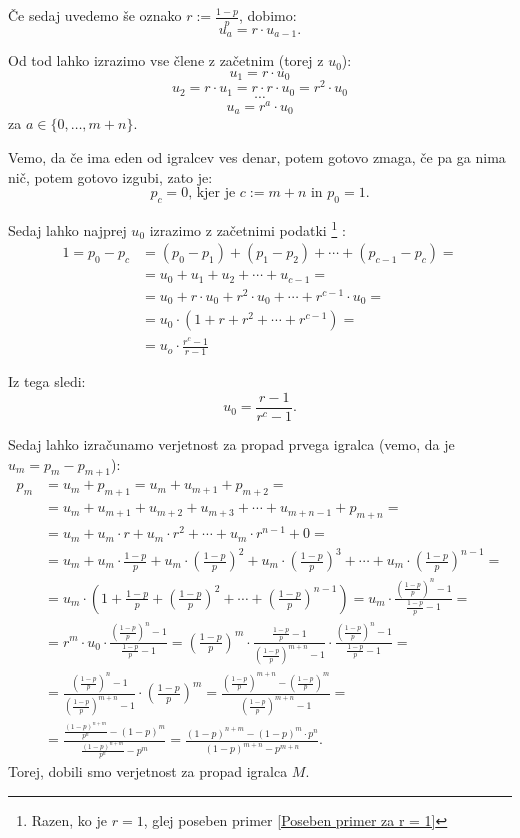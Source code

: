 \documentclass[12pt, a4paper]{article}
\begin{document}
Če sedaj uvedemo še oznako $r:=\frac{1-p}{p}$, dobimo:
$$u_a = r \cdot u_{a-1}.$$


Od tod lahko izrazimo vse člene z začetnim (torej z $u_0$):
$$u_1 = r \cdot u_0$$
$$u_2 = r \cdot u_1 = r \cdot r \cdot u_0 = r^2 \cdot u_0$$ 
$$\cdots $$
$$u_a = r^a \cdot u_0$$ za $ a \in \{ 0, \dotso , m + n\}.$

Vemo, da če ima eden od igralcev ves denar, potem gotovo zmaga, če pa ga nima nič, potem gotovo izgubi, zato je:
$$p_c = 0 \textrm{, kjer je } c := m + n \textrm{ in } p_0 = 1.$$

Sedaj lahko najprej $u_0$ izrazimo z začetnimi podatki \footnote{Razen, ko je $r = 1$, glej poseben primer \ref{Poseben primer za r = 1}} :
\begin{equation*}
\begin{split}
1 = p_0 - p_c &= (p_0 - p_1) + (p_1 - p_2) + \cdots + (p_{c-1} - p_c) = \\
        &= u_0 + u_1 + u_2 + \cdots + u_{c-1} = \\
        &= u_0 + r \cdot u_0 + r^2 \cdot u_0 + \cdots + r^{c-1} \cdot u_0 = \\
        &= u_0 \cdot (1 + r + r^2 + \cdots + r^{c-1}) = \\
        &= u_o \cdot \frac{r^c - 1}{r-1}  
\end{split}
\end{equation*}  

Iz tega sledi: $$u_0 = \frac{r-1}{r^c -1}.$$


Sedaj lahko izračunamo verjetnost za propad prvega igralca (vemo, da je $u_m = p_m - p_{m+1}$):
\begin{equation*}
\begin{split}
p_m &= u_m + p_{m+1} = u_m + u_{m+1} + p_{m+2} = \\
    &= u_m + u_{m+1} + u_{m+2} + u_{m+3} + \cdots + u_{m+n-1} + p_{m+n} = \\
    &= u_m + u_m \cdot r + u_m \cdot r^2 + \cdots + u_m \cdot r^{n-1} + 0 = \\
    &= u_m + u_m \cdot \frac{1-p}{p} + u_m \cdot (\frac{1-p}{p})^2 + u_m \cdot (\frac{1-p}{p})^3 + \cdots + u_m \cdot (\frac{1-p}{p})^{n-1} = \\
    &= u_m \cdot (1 + \frac{1-p}{p} + (\frac{1-p}{p})^2 + \cdots + (\frac{1-p}{p})^{n-1}) 
    = u_m \cdot \frac{(\frac{1-p}{p})^n - 1}{\frac{1-p}{p} - 1} = \\
    &= r^m \cdot u_0 \cdot \frac{(\frac{1-p}{p})^n - 1}{\frac{1-p}{p} - 1}  
    = (\frac{1-p}{p})^m \cdot \frac{\frac{1-p}{p} - 1}{(\frac{1-p}{p})^{m+n} -1}\cdot \frac{(\frac{1-p}{p})^n - 1}{\frac{1-p}{p} - 1} = \\
    &= \frac{(\frac{1-p}{p})^n - 1}{(\frac{1-p}{p})^{m+n} -1} \cdot (\frac{1-p}{p})^m 
    = \frac{(\frac{1-p}{p})^{m+n} - (\frac{1-p}{p})^m}{(\frac{1-p}{p})^{m+n} -1} = \\
    &= \frac{\frac{(1-p)^{n+m}}{p^n} - (1-p)^m}{\frac{(1-p)^{n+m}}{p^n} - p^m} = 
    \frac{(1-p)^{n+m} - (1-p)^m \cdot p^n}{(1-p)^{m+n} - p^{m+n}}.
\end{split} 
\end{equation*}
Torej, dobili smo verjetnost za propad igralca $M$.
\end{document}
